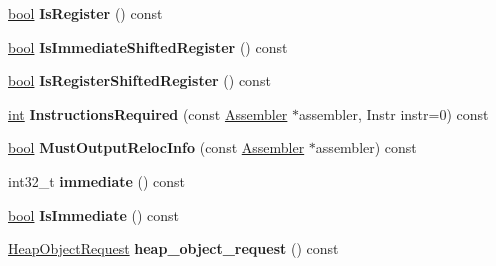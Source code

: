 \begin{DoxyCompactItemize}
\item 
\mbox{\label{classv8_1_1internal_1_1Operand_a85c589158d773dfd18246ac02243ce1c}} 
\mbox{\hyperlink{classbool}{bool}} {\bfseries Is\+Register} () const
\item 
\mbox{\label{classv8_1_1internal_1_1Operand_ac54504a0390149053d04c1c570b1964f}} 
\mbox{\hyperlink{classbool}{bool}} {\bfseries Is\+Immediate\+Shifted\+Register} () const
\item 
\mbox{\label{classv8_1_1internal_1_1Operand_ade099697ab8a6849eee480a9692d275b}} 
\mbox{\hyperlink{classbool}{bool}} {\bfseries Is\+Register\+Shifted\+Register} () const
\item 
\mbox{\label{classv8_1_1internal_1_1Operand_a1b972dbb1d3ef5862dd3d8a434e4dda3}} 
\mbox{\hyperlink{classint}{int}} {\bfseries Instructions\+Required} (const \mbox{\hyperlink{classv8_1_1internal_1_1Assembler}{Assembler}} $\ast$assembler, Instr instr=0) const
\item 
\mbox{\label{classv8_1_1internal_1_1Operand_a7a161d87720340a22a1a0ce8382016c7}} 
\mbox{\hyperlink{classbool}{bool}} {\bfseries Must\+Output\+Reloc\+Info} (const \mbox{\hyperlink{classv8_1_1internal_1_1Assembler}{Assembler}} $\ast$assembler) const
\item 
\mbox{\label{classv8_1_1internal_1_1Operand_af8ae196ec3645d6e0e370c2c84d57357}} 
int32\+\_\+t {\bfseries immediate} () const
\item 
\mbox{\label{classv8_1_1internal_1_1Operand_a8da286359e60a5ab8ba6e368fdca7d8b}} 
\mbox{\hyperlink{classbool}{bool}} {\bfseries Is\+Immediate} () const
\item 
\mbox{\label{classv8_1_1internal_1_1Operand_a9beaf04cfc4aea3a9d725172753766ed}} 
\mbox{\hyperlink{classv8_1_1internal_1_1HeapObjectRequest}{Heap\+Object\+Request}} {\bfseries heap\+\_\+object\+\_\+request} () const
\item 
\mbox{\label{classv8_1_1internal_1_1Operand_adc7ce8d04bde8ab9674a1bdc9689e5ee}} 

\end{DoxyCompactItemize}
